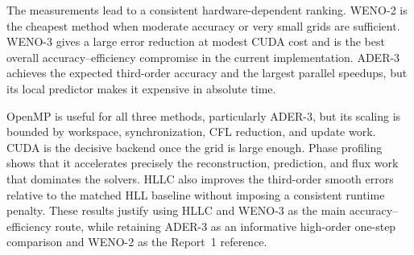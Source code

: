 The measurements lead to a consistent hardware-dependent ranking.  WENO-2 is the cheapest
method when moderate accuracy or very small grids are sufficient.  WENO-3 gives a large
error reduction at modest CUDA cost and is the best overall accuracy--efficiency compromise
in the current implementation.  ADER-3 achieves the expected third-order accuracy and the
largest parallel speedups, but its local predictor makes it expensive in absolute time.

OpenMP is useful for all three methods, particularly ADER-3, but its scaling is bounded by
workspace, synchronization, CFL reduction, and update work.  CUDA is the decisive backend
once the grid is large enough. Phase profiling shows that it accelerates precisely the
reconstruction, prediction, and flux work that dominates the solvers.  HLLC also improves
the third-order smooth errors relative to the matched HLL baseline without imposing a
consistent runtime penalty.  These results justify using HLLC and WENO-3 as the main
accuracy--efficiency route, while retaining ADER-3 as an informative high-order one-step
comparison and WENO-2 as the Report~1 reference.

\FloatBarrier
